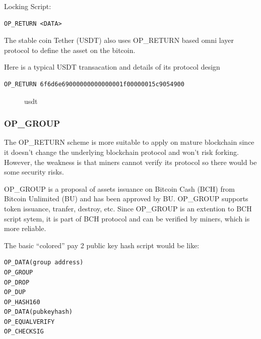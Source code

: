 \documentclass[a4paper,11pt]{article}
\begin{document}
Locking Script:
\begin{lstlisting}
OP_RETURN <DATA>
\end{lstlisting}

The stable coin Tether (USDT) also uses OP\_RETURN based omni layer protocol to define the asset on the bitcoin. 

Here is a typical USDT transacation and details of its protocol design


\lstset{basicstyle=\tiny,style=myListStyle}
\begin{lstlisting}
OP_RETURN 6f6d6e69000000000000001f00000015c9054900
\end{lstlisting}


\begin{figure}[hbt]
	\centerline{%
	}
\caption{usdt}
\end{figure}





\subsubsection{OP\_GROUP}
The OP\_RETURN scheme is more suitable to apply on mature blockchain since it doesn't change the underlying blockchain protocol and won't risk forking. However, the weakness  is that miners cannot verify its protocol so there would be some security risks.

OP\_GROUP is a proposal of assets issuance  on Bitcoin Cash (BCH) from Bitcoin Unlimited (BU) and has been approved by BU. OP\_GROUP supports token issuance, tranfer, destroy, etc. Since OP\_GROUP is an extention to BCH script sytem,  it is part of BCH protocol and can be verified by miners, which is more reliable.

The basic “colored” pay 2 public key hash script would be like: 

\lstset{basicstyle=\tiny,style=myListStyle}
\begin{lstlisting}
OP_DATA(group address)  
OP_GROUP  
OP_DROP  
OP_DUP  
OP_HASH160  
OP_DATA(pubkeyhash)  
OP_EQUALVERIFY  
OP_CHECKSIG
\end{lstlisting}
\end{document}
